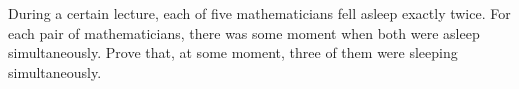 During a certain lecture, each of five mathematicians fell asleep exactly twice. For each pair of mathematicians, there was some moment when both were asleep simultaneously. Prove that, at some moment, three of them were sleeping simultaneously.